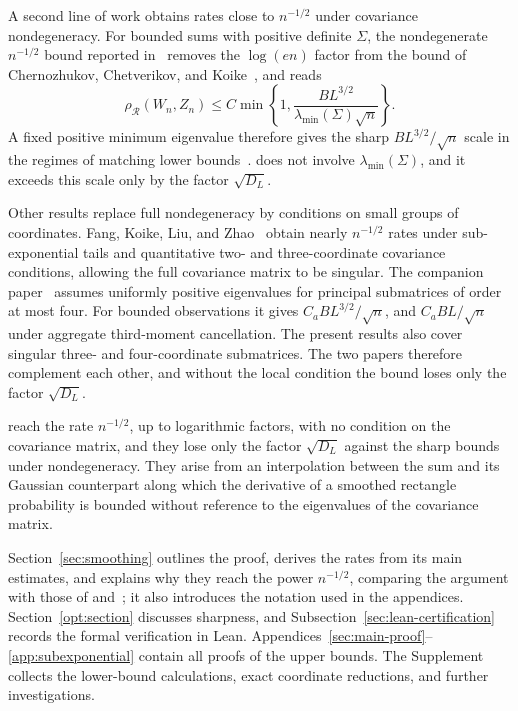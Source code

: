 \documentclass[11pt,letterpaper]{article}
\newif\ifshowpolish
\newcommand{\polish}[1]{\ifshowpolish{\color{magenta}%
\hypersetup{linkcolor=magenta,citecolor=magenta,urlcolor=magenta}#1}\else#1\fi}
\newif\ifshowrev
\newcommand{\rev}[1]{\ifshowrev{\color{revblue}%
\hypersetup{linkcolor=revblue,citecolor=revblue,urlcolor=revblue}#1}\else#1\fi}
\newif\ifshowpass
\newcommand{\pass}[1]{\ifshowpass{\color{revblue}%
\hypersetup{linkcolor=revblue,citecolor=revblue,urlcolor=revblue}#1}\else#1\fi}
\newif\ifshowtrim
\newcommand{\trim}[1]{\ifshowtrim{\color{revblue}%
\hypersetup{linkcolor=revblue,citecolor=revblue,urlcolor=revblue}#1}\else#1\fi}
\newcommand{\trs}[1]{\ifshowtrim{\color{revblue}#1}\else#1\fi}
\newif\ifshowlin
\newcommand{\lin}[1]{\ifshowlin{\color{revblue}%
\hypersetup{linkcolor=revblue,citecolor=revblue,urlcolor=revblue}#1}\else#1\fi}
\newif\ifshowskill
\newcommand{\skl}[1]{\ifshowskill{\color{revblue}%
\hypersetup{linkcolor=revblue,citecolor=revblue,urlcolor=revblue}#1}\else#1\fi}
\newif\ifshownat
\newcommand{\nat}[1]{\ifshownat{\color{revblue}%
\hypersetup{linkcolor=revblue,citecolor=revblue,urlcolor=revblue}#1}\else#1\fi}
\newif\ifshowintro
\newcommand{\itx}[1]{\ifshowintro{\color{revblue}%
\hypersetup{linkcolor=revblue,citecolor=revblue,urlcolor=revblue}#1}\else#1\fi}
\theoremstyle{remark}
\newcommand{\rh}{\rho_{\mathcal R}}
\begin{document}
A second line of work obtains rates close to \(n^{-1/2}\) under
covariance nondegeneracy. For bounded sums with positive definite
\(\Sigma\), \nat{the nondegenerate \(n^{-1/2}\) bound reported in~\cite[Theorem~1.1]{AL} removes the}
\(\log(en)\) factor from the bound of Chernozhukov, Chetverikov,
and Koike~\cite[Corollary~2.1]{CCK}, \nat{and reads}
\begin{equation*}
 \rh(W_n,Z_n)\le C\min\left\{1,
 \frac{BL^{3/2}}{\lambda_{\min}(\Sigma)\sqrt n}\right\}.
\end{equation*}
A fixed positive minimum eigenvalue therefore gives the sharp
\(BL^{3/2}/\sqrt n\) scale in the regimes of matching lower
bounds\pass{~\cite[Proposition~2.1]{CCK}}.
\rev{ does not involve \(\lambda_{\min}(\Sigma)\),
and it exceeds this scale only by the factor \(\sqrt{D_L}\).}

\rev{Other results replace full nondegeneracy by conditions on small
groups of coordinates.} Fang, Koike, Liu, and Zhao~\cite[Theorem~1.1]{FKLZ} obtain nearly
\(n^{-1/2}\) rates under \skl{sub-exponential tails} and quantitative
two- and three-coordinate covariance conditions, allowing the full
covariance matrix to be singular. The companion paper~\cite{Local}
assumes uniformly positive eigenvalues for principal submatrices of
order at most four. For bounded observations it gives
\(C_aBL^{3/2}/\sqrt n\), and \(C_aBL/\sqrt n\) under aggregate
third-moment cancellation. The present results also cover singular
three- and four-coordinate submatrices. \rev{The two papers therefore
complement each other, and without the local condition the bound loses
only the factor \(\sqrt{D_L}\).}

\skl{ reach the rate \(n^{-1/2}\), up to logarithmic factors, with
no condition on the covariance matrix, and they lose only the factor
\(\sqrt{D_L}\) against the sharp bounds under nondegeneracy. They \itx{arise}
from an interpolation between the sum and its Gaussian counterpart along
which the derivative of a smoothed rectangle probability is bounded
without reference to the eigenvalues of the covariance matrix.}

\rev{Section~\ref{sec:smoothing} outlines the proof\trim{, derives
the rates from its main estimates, and explains why they reach the
power \(n^{-1/2}\)\lin{, comparing the argument with those of \nat{\cite{AL} and~\cite{GaoZhang}}}; it also} introduces the
notation used in the appendices\trim{. Section~\ref{opt:section}
discusses sharpness}, and \skl{Subsection~\ref{sec:lean-certification}}
records the formal verification\skl{ in Lean}.}
Appendices~\trs{\ref{sec:main-proof}}--\ref{app:subexponential}
contain all proofs of the upper bounds. \polish{The Supplement~\cite{Supplement} collects the lower-bound calculations,
exact coordinate reductions, and further investigations.}
\end{document}
